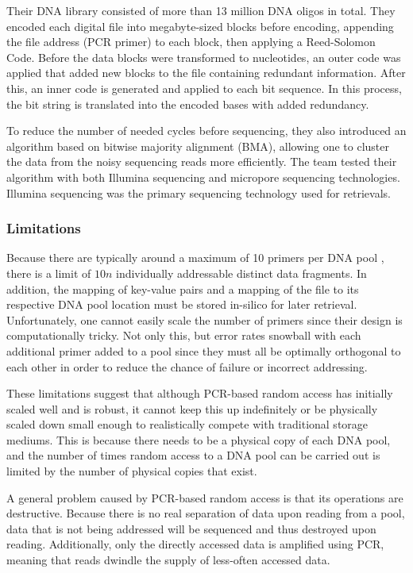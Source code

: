 \documentclass[a4paper,conference]{IEEEtran}
\begin{document}
Their DNA library consisted of more than 13 million DNA oligos in total. They encoded each digital file into megabyte-sized blocks before encoding, appending the file address (PCR primer) to each block, then applying a Reed-Solomon Code. Before the data blocks were transformed to nucleotides, an outer code was applied that added new blocks to the file containing redundant information. After this, an inner code is generated and applied to each bit sequence. In this process, the bit string is translated into the encoded bases with added redundancy. 

To reduce the number of needed cycles before sequencing, they also introduced an algorithm based on bitwise majority alignment (BMA), allowing one to cluster the data from the noisy sequencing reads more efficiently. The team tested their algorithm with both Illumina sequencing and micropore sequencing technologies. Illumina sequencing was the primary sequencing technology used for retrievals.

\subsubsection{Limitations}
Because there are typically around a maximum of 10 primers per DNA pool \cite{}, there is a limit of $10n$ individually addressable distinct data fragments. In addition, the mapping of key-value pairs and a mapping of the file to its respective DNA pool location must be stored in-silico for later retrieval. Unfortunately, one cannot easily scale the number of primers since their design is computationally tricky. Not only this, but error rates snowball with each additional primer added to a pool since they must all be optimally orthogonal to each other in order to reduce the chance of failure or incorrect addressing.

These limitations suggest that although PCR-based random access has initially scaled well and is robust, it cannot keep this up indefinitely or be physically scaled down small enough to realistically compete with traditional storage mediums. This is because there needs to be a physical copy of each DNA pool, and the number of times random access to a DNA pool can be carried out is limited by the number of physical copies that exist.

A general problem caused by PCR-based random access is that its operations are destructive. Because there is no real separation of data upon reading from a pool, data that is not being addressed will be sequenced and thus destroyed upon reading. Additionally, only the directly accessed data is amplified using PCR, meaning that reads dwindle the supply of less-often accessed data.
\end{document}
